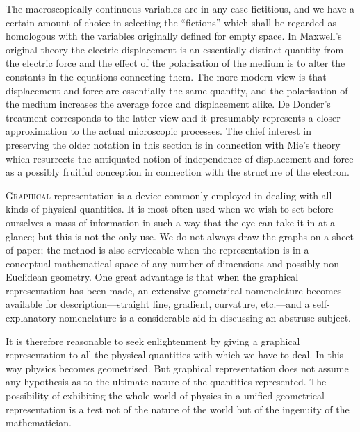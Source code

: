 \documentclass[12pt]{book}
\begin{document}
The macroscopically continuous variables are in any case fictitious, and we have a certain amount of choice in
selecting the ``fictions'' which shall be regarded as homologous with the variables originally defined for
empty space.
In Maxwell's original theory the electric displacement is an essentially distinct quantity from the electric force
and the effect of the polarisation of the medium is to alter the constants in the equations connecting them.
The more modern view is that displacement and force are essentially the same quantity, and the polarisation of
the medium increases the average force and displacement alike.
De Donder's treatment corresponds to the latter view and it presumably represents a closer approximation to
the actual microscopic processes.
The chief interest in preserving the older notation in this section is in connection with Mie's theory which
resurrects the antiquated notion of independence of displacement and force as a possibly fruitful conception in
connection with the structure of the electron.



%

\lettrine{\textcolor{lettrinecolour}{G}}{raphical} representation is a device commonly employed in dealing with
%
all kinds of physical quantities. It is most often used when we wish to set
before ourselves a mass of information in such a way that the eye can take it
in at a glance; but this is not the only use. We do not always draw the graphs
on a sheet of paper; the method is also serviceable when the representation
is in a conceptual mathematical space of any number of dimensions and possibly
non\hyp{}Euclidean geometry. One great advantage is that when the graphical
representation has been made, an extensive geometrical nomenclature becomes
available for description---straight line, gradient, curvature, etc.---and a self\hyp{}explanatory
nomenclature is a considerable aid in discussing an abstruse
subject.

It is therefore reasonable to seek enlightenment by giving a graphical
representation to all the physical quantities with which we have to deal. In
this way physics becomes geometrised. But graphical representation does not
assume any hypothesis as to the ultimate nature of the quantities represented.
The possibility of exhibiting the whole world of physics in a unified geometrical
representation is a test not of the nature of the world but of the ingenuity of
the mathematician.
\end{document}
